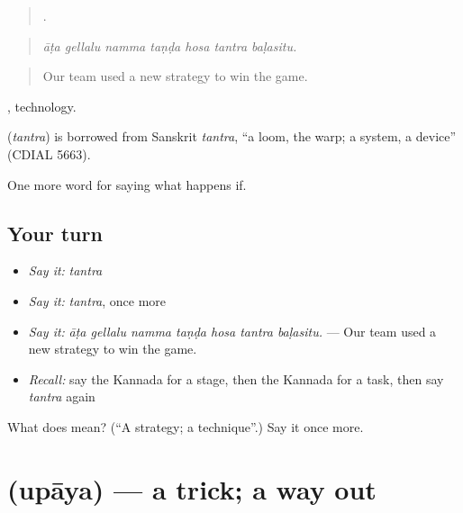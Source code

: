 \begin{quote}
      .
\end{quote}

\begin{quote}
\emph{āṭa gellalu namma taṇḍa hosa tantra baḷasitu.}
\end{quote}

\begin{quote}
Our team used a new strategy to win the game.
\end{quote}

, technology.

\begin{cousinweb}
\textbf{} (\emph{tantra}) is borrowed from Sanskrit \emph{tantra}, \textquotedblleft{}a loom, the warp; a system, a device\textquotedblright{} (CDIAL 5663).
\end{cousinweb}

\begin{grammarlens}[title={What you've built}]
One more word for saying what happens if.
\end{grammarlens}

\subsection*{Your turn}
\begin{itemize}
\raggedright
  \item \emph{Say it:} \emph{tantra}
  \item \emph{Say it:} \emph{tantra}, once more
  \item \emph{Say it:} \emph{āṭa gellalu namma taṇḍa hosa tantra baḷasitu.} — Our team used a new strategy to win the game.
  \item \emph{Recall:} say the Kannada for a stage, then the Kannada for a task, then say \emph{tantra} again
\end{itemize}

\begin{tcolorbox}[breakable,colback=teal!4,colframe=teal!35!black,title={Before you move on}]
What does  mean? (\textquotedblleft{}A strategy; a technique\textquotedblright{}.) Say it once more.
\end{tcolorbox}
\section[\texorpdfstring{\kn{ಉಪಾಯ} (upāya)}{ಉಪಾಯ (upāya)}]{ (upāya) — a trick; a way out}

